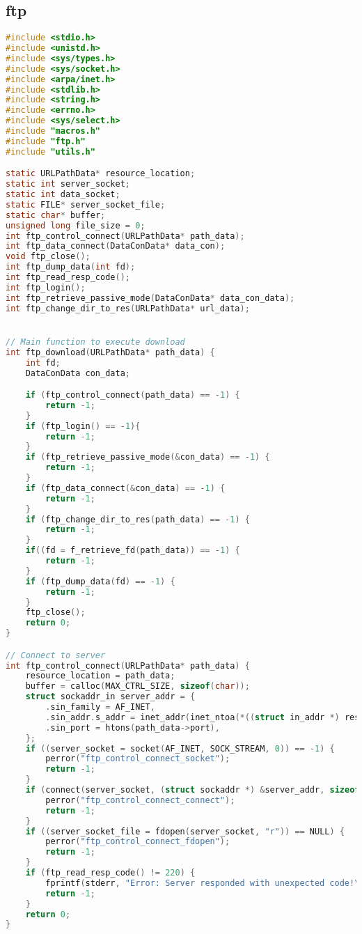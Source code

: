 \subsection{ftp}
\begin{lstlisting}[language=C, caption=ftp.c]
#include <stdio.h>
#include <unistd.h>
#include <sys/types.h>
#include <sys/socket.h>
#include <arpa/inet.h>
#include <stdlib.h>
#include <string.h>
#include <errno.h>
#include <sys/select.h>
#include "macros.h"
#include "ftp.h"
#include "utils.h"

static URLPathData* resource_location;
static int server_socket;
static int data_socket;
static FILE* server_socket_file;
static char* buffer;
unsigned long file_size = 0;
int ftp_control_connect(URLPathData* path_data);
int ftp_data_connect(DataConData* data_con);
void ftp_close();
int ftp_dump_data(int fd);
int ftp_read_resp_code();
int ftp_login();
int ftp_retrieve_passive_mode(DataConData* data_con_data);
int ftp_change_dir_to_res(URLPathData* url_data);


// Main function to execute download
int ftp_download(URLPathData* path_data) {
    int fd;
    DataConData con_data;

    if (ftp_control_connect(path_data) == -1) {
        return -1;
    }
    if (ftp_login() == -1){
        return -1;
    }
    if (ftp_retrieve_passive_mode(&con_data) == -1) {
        return -1;
    }
    if (ftp_data_connect(&con_data) == -1) {
        return -1;
    }
    if (ftp_change_dir_to_res(path_data) == -1) {
        return -1;
    }
    if((fd = f_retrieve_fd(path_data)) == -1) {
        return -1;
    }
    if (ftp_dump_data(fd) == -1) {
        return -1;
    }
    ftp_close();
    return 0;
}

// Connect to server
int ftp_control_connect(URLPathData* path_data) {
    resource_location = path_data;
    buffer = calloc(MAX_CTRL_SIZE, sizeof(char));
    struct sockaddr_in server_addr = {
        .sin_family = AF_INET,
        .sin_addr.s_addr = inet_addr(inet_ntoa(*((struct in_addr *) resource_location->sv_addr))),
        .sin_port = htons(path_data->port),
    };
    if ((server_socket = socket(AF_INET, SOCK_STREAM, 0)) == -1) {
        perror("ftp_control_connect_socket");
        return -1;
    } 
    if (connect(server_socket, (struct sockaddr *) &server_addr, sizeof(server_addr)) == -1) {
        perror("ftp_control_connect_connect");
        return -1;
    }
    if ((server_socket_file = fdopen(server_socket, "r")) == NULL) {
        perror("ftp_control_connect_fdopen");
        return -1;
    }
    if (ftp_read_resp_code() != 220) {
        fprintf(stderr, "Error: Server responded with unexpected code!\n");
        return -1;
    }
    return 0;
}


\end{lstlisting}
